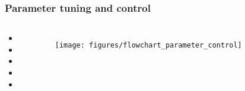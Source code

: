 \begin{frame}
	\frametitle{Parameter tuning and control}
	
	\begin{columns}[c]
		

		\begin{itemize}
			\item 
			\item 
			\item 
			\item
			\item
		\end{itemize}
		
		\begin{figure}
			\texttt{[image: figures/flowchart\_parameter\_control]}
		\end{figure}

	\end{columns}
	
\end{frame}